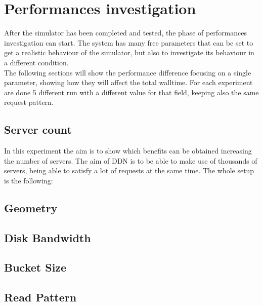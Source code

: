 \chapter{Performances investigation}\label{sys-analysis}
After the simulator has been completed and tested, the phase of performances
investigation can start. The system has many free parameters that can be set to
get a realistic behaviour of the simulator, but also to investigate its
behaviour in a different condition. \\
The following sections will show the performance difference focusing on a single
parameter, showing how they will affect the total walltime. For each experiment
are done 5 different run with a different value for that field, keeping also the
same request pattern.
\section{Server count}
In this experiment the aim is to show which benefits can be obtained increasing
the number of servers. The aim of DDN is to be able to make use of thousands of
servers, being able to satisfy a lot of requests at the same time. The whole
setup is the following:
\section{Geometry}
\section{Disk Bandwidth}
\section{Bucket Size}
\section{Read Pattern}
